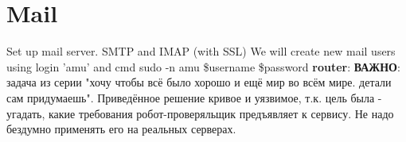\documentclass[a4paper,10pt]{report}
\begin{document}
\chapter{Mail}
\label{ch:mail}
Set up mail server. SMTP and IMAP (with SSL)
\newline
We will create new mail users using login 'amu' and cmd
sudo -n amu \$username \$password
\newline\newline
\textbf{router}:
\newline
\textbf{ВАЖНО}: задача из серии "хочу чтобы всё было хорошо и ещё мир во всём мире. детали сам придумаешь". Приведённое решение кривое и уязвимое, т.к. цель была - угадать, какие требования робот-проверяльщик предъявляет к сервису. Не надо бездумно применять его на реальных серверах.
\newline\newline
\end{document}
